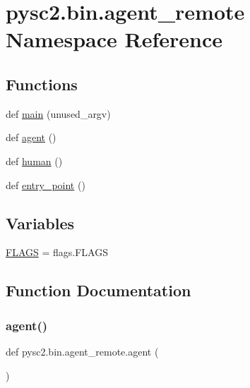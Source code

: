 \hypertarget{namespacepysc2_1_1bin_1_1agent__remote}{}\section{pysc2.\+bin.\+agent\+\_\+remote Namespace Reference}
\label{namespacepysc2_1_1bin_1_1agent__remote}
\subsection*{Functions}
\begin{DoxyCompactItemize}
\item 
def \mbox{\hyperlink{namespacepysc2_1_1bin_1_1agent__remote_ae7bb058975665622ebf46ffca87d9b20}{main}} (unused\+\_\+argv)
\item 
def \mbox{\hyperlink{namespacepysc2_1_1bin_1_1agent__remote_ae63c937fe50a7f29e2156afb9977c5c8}{agent}} ()
\item 
def \mbox{\hyperlink{namespacepysc2_1_1bin_1_1agent__remote_aa0157ae37d2401ed1308694ee52fe3f7}{human}} ()
\item 
def \mbox{\hyperlink{namespacepysc2_1_1bin_1_1agent__remote_ad9e2b12b387da54280a79e67cc44e773}{entry\+\_\+point}} ()
\end{DoxyCompactItemize}
\subsection*{Variables}
\begin{DoxyCompactItemize}
\item 
\mbox{\hyperlink{namespacepysc2_1_1bin_1_1agent__remote_ad707313fc71429a8440955655c02f650}{F\+L\+A\+GS}} = flags.\+F\+L\+A\+GS
\end{DoxyCompactItemize}


\subsection{Function Documentation}
\mbox{\label{namespacepysc2_1_1bin_1_1agent__remote_ae63c937fe50a7f29e2156afb9977c5c8}} 
\subsubsection{\texorpdfstring{agent()}{agent()}}
{\footnotesize\ttfamily def pysc2.\+bin.\+agent\+\_\+remote.\+agent (\begin{DoxyParamCaption}{ }\end{DoxyParamCaption})}

